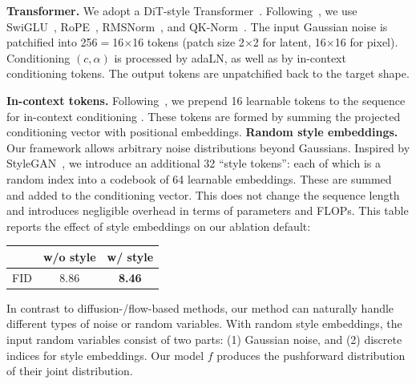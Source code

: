\documentclass{article}
\newcommand{\tablestyle}[2]{\setlength{\tabcolsep}{#1}\renewcommand{\arraystretch}{#2}\centering
\small
}
\newcommand\tablefontsize{%
  \fontsize{8pt}{9pt}\selectfont
}
\renewcommand{\paragraph}[1]{\vspace{.05em}\noindent\textbf{#1}}
\theoremstyle{plain}
\theoremstyle{definition}
\theoremstyle{remark}
\begin{document}
\paragraph{Transformer.}
We adopt a DiT-style Transformer~\citep{peebles2023scalable}. Following~\citep{yao2025reconstruction}, we use SwiGLU~\citep{shazeer2020glu}, RoPE~\citep{su2024roformer}, RMSNorm~\citep{zhang2019root}, and QK-Norm~\citep{henry2020query}.
The input Gaussian noise is patchified into 256$=$16$\times$16 tokens (patch size 2$\times$2 for latent, 16$\times$16 for pixel).
Conditioning $(c, \alpha)$ is processed by adaLN, as well as by in-context conditioning tokens.
The output tokens are unpatchified back to the target shape.

\paragraph{In-context tokens.}
Following~\cite{li2025back}, we prepend 16 learnable tokens to the sequence for in-context conditioning \cite{peebles2023scalable}.
These tokens are formed by summing the projected conditioning vector with positional embeddings.
\paragraph{Random style embeddings.}
Our framework allows arbitrary noise distributions beyond Gaussians.
Inspired by StyleGAN~\cite{sauer2022stylegan}, we introduce an additional 32 ``style tokens'': each of which is a random index into a codebook of 64 learnable embeddings.
These are summed and added to the conditioning vector.
This does not change the sequence length and introduces negligible overhead in terms of parameters and FLOPs. This table reports the effect of style embeddings on our ablation default:

\begin{center}
\tablestyle{6pt}{1.02}
\tablefontsize
\begin{tabular}{c|cc}
\toprule
 & w/o style & w/ style \\
\midrule
FID & 8.86 & \textbf{8.46} \\
\bottomrule
\end{tabular}
\end{center}

In contrast to diffusion-/flow-based methods, our method can naturally handle different types of noise or random variables.
With random style embeddings, the input random variables consist of two parts: (1) Gaussian noise, and (2) discrete indices for style embeddings. Our model $f$ produces the pushforward distribution of their joint distribution.
\end{document}
